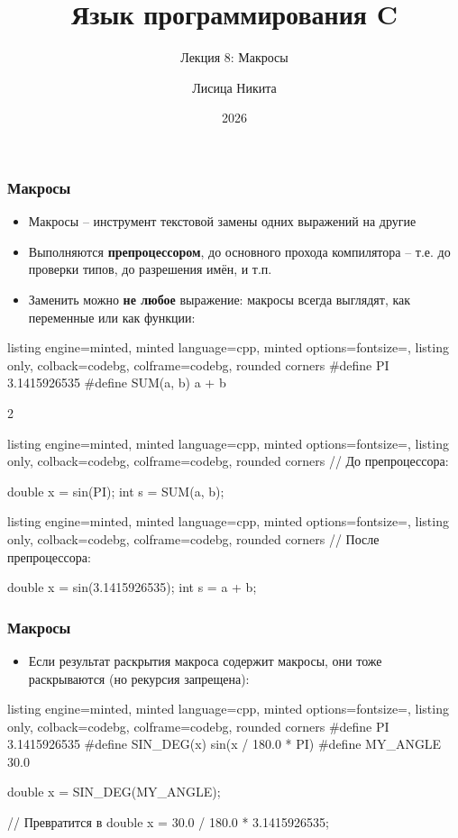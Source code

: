 \documentclass[10pt]{beamer}
\title{Язык программирования C}
\subtitle{Лекция 8: Макросы}
\author{Лисица Никита}
\date{2026}
\begin{document}
\frame{\titlepage}

\begin{frame}[fragile]
\frametitle{Макросы}
\begin{itemize}
\item Макросы -- инструмент текстовой замены одних выражений на другие
\pause
\item Выполняются \textbf{препроцессором}, до основного прохода компилятора -- т.е. до проверки типов, до разрешения имён, и т.п.
\pause
\item Заменить можно \textbf{не любое} выражение: макросы всегда выглядят, как переменные или как функции:
\end{itemize}
\begin{tcblisting}{listing engine=minted, minted language=cpp, minted options={fontsize=\scriptsize}, listing only, colback=codebg, colframe=codebg, rounded corners}
#define PI 3.1415926535
#define SUM(a, b) a + b
\end{tcblisting}
\pause
\begin{multicols}{2}
\begin{tcblisting}{listing engine=minted, minted language=cpp, minted options={fontsize=\scriptsize}, listing only, colback=codebg, colframe=codebg, rounded corners}
// До препроцессора:

double x = sin(PI);
int s = SUM(a, b);
\end{tcblisting}
\columnbreak
\begin{tcblisting}{listing engine=minted, minted language=cpp, minted options={fontsize=\scriptsize}, listing only, colback=codebg, colframe=codebg, rounded corners}
// После препроцессора:

double x = sin(3.1415926535);
int s = a + b;
\end{tcblisting}
\end{multicols}
\end{frame}

\begin{frame}[fragile]
\frametitle{Макросы}
\begin{itemize}
\item Если результат раскрытия макроса содержит макросы, они тоже раскрываются (но рекурсия запрещена):
\end{itemize}
\begin{tcblisting}{listing engine=minted, minted language=cpp, minted options={fontsize=\scriptsize}, listing only, colback=codebg, colframe=codebg, rounded corners}
#define PI 3.1415926535
#define SIN_DEG(x) sin(x / 180.0 * PI)
#define MY_ANGLE 30.0

double x = SIN_DEG(MY_ANGLE);

// Превратится в
double x = 30.0 / 180.0 * 3.1415926535;
\end{tcblisting}
\end{frame}
\end{document}
